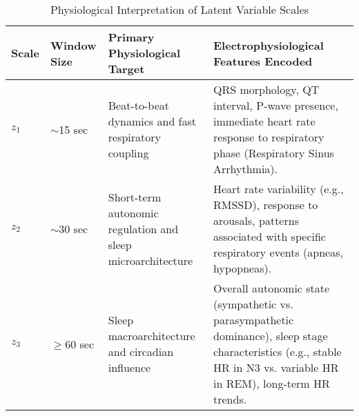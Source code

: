 \documentclass[10pt, conference]{IEEEtran}
\begin{document}
\begin{table}[ht]
\centering
\caption{Physiological Interpretation of Latent Variable Scales}
\label{tab:latent_interpretation}
\begin{tabular}{llll}
  \toprule
  \textbf{Scale} & \textbf{Window Size} & \textbf{Primary Physiological Target} & \textbf{Electrophysiological Features Encoded} \\
  \midrule
  $z_1$ & $\sim$15 sec & Beat-to-beat dynamics and fast respiratory coupling & QRS morphology, QT interval, P-wave presence, immediate heart rate response to respiratory phase (Respiratory Sinus Arrhythmia). \\
  $z_2$ & $\sim$30 sec & Short-term autonomic regulation and sleep microarchitecture & Heart rate variability (e.g., RMSSD), response to arousals, patterns associated with specific respiratory events (apneas, hypopneas). \\
  $z_3$ & $\geq$60 sec & Sleep macroarchitecture and circadian influence & Overall autonomic state (sympathetic vs. parasympathetic dominance), sleep stage characteristics (e.g., stable HR in N3 vs. variable HR in REM), long-term HR trends. \\
  \bottomrule
\end{tabular}
\end{table}
\end{document}
